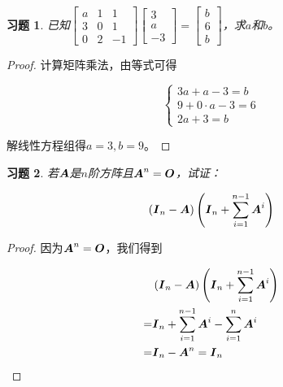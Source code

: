 \documentclass{ctexart}
\newtheorem{problem}{习题}[section]
\begin{document}
\begin{problem}
已知\(\begin{bmatrix}a&1&1\\3&0&1\\0&2&-1\end{bmatrix}\begin{bmatrix}3\\a\\-3\end{bmatrix}=\begin{bmatrix}b\\6\\b\end{bmatrix}\)，求\(a\)和\(b\)。
\end{problem}
\begin{proof}
    计算矩阵乘法，由等式可得

    \begin{equation*}
        \begin{cases}
            3a+a-3=b       \\
            9+0\cdot a-3=6 \\
            2a+3=b
        \end{cases}
    \end{equation*}

    解线性方程组得\(a=3,b=9\)。
\end{proof}

\begin{problem}
若\(\boldsymbol{A}\)是\(n\)阶方阵且\(\boldsymbol{A}^n=\boldsymbol{O}\)，试证：

\begin{equation*}
    \left( \boldsymbol{I}_n-\boldsymbol{A} \right)\left( \boldsymbol{I}_n+\sum_{i=1}^{n-1}\boldsymbol{A}^i \right)
\end{equation*}
\end{problem}
\begin{proof}
    因为\(\boldsymbol{A}^n=\boldsymbol{O}\)，我们得到

    \begin{align*}
          & \left( \boldsymbol{I}_n-\boldsymbol{A} \right)\left( \boldsymbol{I}_n+\sum_{i=1}^{n-1}\boldsymbol{A}^i \right) \\
        = & \boldsymbol{I}_n+\sum_{i=1}^{n-1}\boldsymbol{A}^i-\sum_{i=1}^n\boldsymbol{A}^i          \\
        = & \boldsymbol{I}_n-\boldsymbol{A}^n=\boldsymbol{I}_n
    \end{align*}
\end{proof}
\end{document}
